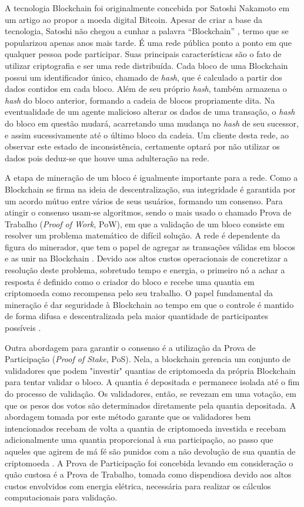 A tecnologia Blockchain foi originalmente concebida por Satoshi Nakamoto em um artigo ao propor a moeda digital Bitcoin. Apesar de criar a base da tecnologia, Satoshi não chegou a cunhar a palavra “Blockchain” \cite{nakamoto2009bitcoin}, termo que se popularizou apenas anos mais tarde. É uma rede pública ponto a ponto em que qualquer pessoa pode participar. Suas principais características são o fato de utilizar criptografia e ser uma rede distribuída. Cada bloco de uma Blockchain possui um identificador único, chamado de \emph{hash}, que é calculado a partir dos dados contidos em cada bloco. Além de seu próprio \emph{hash}, também armazena o \emph{hash} do bloco anterior, formando a cadeia de blocos propriamente dita. Na eventualidade de um agente malicioso alterar os dados de uma transação, o \emph{hash} do bloco em questão mudará, acarretando uma mudança no \emph{hash} de seu sucessor, e assim sucessivamente até o último bloco da cadeia. Um cliente desta rede, ao observar este estado de inconsistência, certamente optará por não utilizar os dados pois deduz-se que houve uma adulteração na rede.

A etapa de mineração de um bloco é igualmente importante para a rede. Como a Blockchain se firma na ideia de descentralização, sua integridade é garantida por um acordo mútuo entre vários de seus usuários, formando um consenso. Para atingir o consenso usam-se algoritmos, sendo o mais usado o chamado Prova de Trabalho (\emph{Proof of Work}, PoW), em que a validação de um bloco consiste em resolver um problema matemático de difícil solução. A rede é dependente da figura do minerador, que tem o papel de agregar as transações válidas em blocos e as unir na Blockchain \cite{Xu2019-qi}. Devido aos altos custos operacionais de concretizar a resolução deste problema, sobretudo tempo e energia, o primeiro nó a achar a resposta é definido como o criador do bloco e recebe uma quantia em criptomoeda como recompensa pelo seu trabalho. O papel fundamental da mineração é dar seguridade à Blockchain ao tempo em que o controle é mantido de forma difusa e descentralizada pela maior quantidade de participantes possíveis \cite{Antonopoulos2018-jt}.

Outra abordagem para garantir o consenso é a utilização da Prova de Participação (\emph{Proof of Stake}, PoS). Nela, a blockchain gerencia um conjunto de validadores que podem "investir" quantias de criptomoeda da própria Blockchain para tentar validar o bloco. A quantia é depositada e permanece isolada até o fim do processo de validação. Os validadores, então, se revezam em uma votação, em que os pesos dos votos são determinados diretamente pela quantia depositada. A abordagem tomada por este método garante que os validadores bem intencionados recebam de volta a quantia de criptomoeda investida e recebam adicionalmente uma quantia proporcional à sua participação, ao passo que aqueles que agirem de má fé são punidos com a não devolução de sua quantia de criptomoeda \cite{Antonopoulos2018-jt}. A Prova de Participação foi concebida levando em consideração o quão custosa é a Prova de Trabalho, tomada como dispendiosa devido aos altos custos envolvidos com energia elétrica, necessária para realizar os cálculos computacionais para validação.

